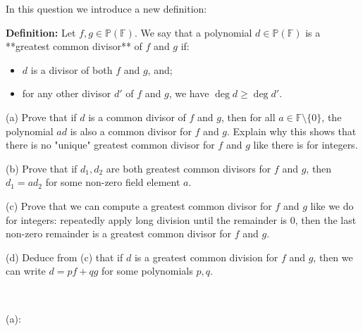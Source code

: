 \documentclass{article}
\theoremstyle{plain} %
\numberwithin{thm}{section} %
\theoremstyle{definition}
\begin{document}
    \newpage
    \begin{question}{7}
        In this question we introduce a new definition:

        \textbf{Definition:} Let \(f, g \in \mathbb{P}(\mathbb{F})\). We say that a polynomial \(d \in \mathbb{P}(\mathbb{F})\) is a **greatest common divisor** of \(f\) and \(g\) if:

        \begin{itemize}
            \item \(d\) is a divisor of both \(f\) and \(g\), and;
            \item for any other divisor \(d'\) of \(f\) and \(g\), we have \(\deg d \geq \deg d'\).
        \end{itemize}

        (a) Prove that if \(d\) is a common divisor of \(f\) and \(g\), then for all \(a \in \mathbb{F}\setminus \{ 0 \}\), the polynomial \(ad\) is also a common divisor for \(f\) and \(g\). Explain why this shows that there is no "unique" greatest common divisor for \(f\) and \(g\) like there is for integers.

        (b) Prove that if \(d_1, d_2\) are both greatest common divisors for \(f\) and \(g\), then \(d_1 = ad_2\) for some non-zero field element \(a\).

        (c) Prove that we can compute a greatest common divisor for \(f\) and \(g\) like we do for integers: repeatedly apply long division until the remainder is 0, then the last non-zero remainder is a greatest common divisor for \(f\) and \(g\).

        (d) Deduce from (c) that if \(d\) is a greatest common division for \(f\) and \(g\), then we can write \(d = pf + qg\) for some polynomials \(p, q\).

        \tcblower
        \ 

        (a):


\end{question}
\end{document}
